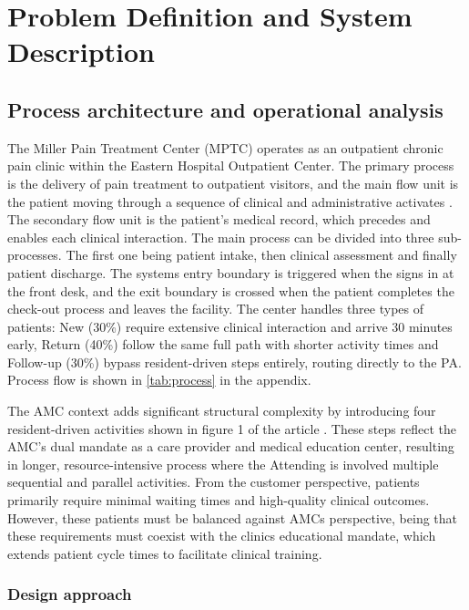 \section{Problem Definition and System Description}

\subsection{Process architecture and operational analysis}

The Miller Pain Treatment Center (MPTC) operates as an outpatient chronic pain clinic within the Eastern Hospital Outpatient Center. The primary process is the delivery of pain treatment to outpatient visitors, and the main flow unit is the patient moving through a sequence of clinical and administrative activates \parencite{pensumbok}. The secondary flow unit is the patient's medical record, which precedes and enables each clinical interaction. The main process can be divided into three sub-processes. The first one being patient intake, then clinical assessment and finally patient discharge. The systems entry boundary is triggered when the signs in at the front desk, and the exit boundary is crossed when the patient completes the check-out process and leaves the facility. The center handles three types of patients: New (30\%) require extensive clinical interaction and arrive 30 minutes early, Return (40\%) follow the same full path with shorter activity times and Follow-up (30\%) bypass resident-driven steps entirely, routing directly to the PA. Process flow is shown in \autoref{tab:process} in the appendix.

\vspace{8pt}
The AMC context adds significant structural complexity by introducing four resident-driven activities shown in figure 1 of the article \parencite[Figure 1]{MillerPainTreatmentCenter}. These steps reflect the AMC's dual mandate as a care provider and medical education center, resulting in longer, resource-intensive process where the Attending is involved multiple sequential and parallel activities. From the customer perspective, patients primarily require minimal waiting times and high-quality clinical outcomes. However, these patients must be balanced against AMCs perspective, being that these requirements must coexist with the clinics educational mandate, which extends patient cycle times to facilitate clinical training. 

\subsubsection{Design approach}


